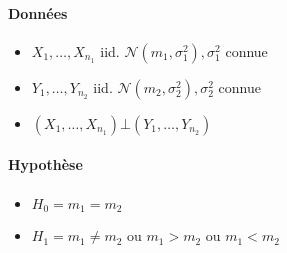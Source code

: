 \documentclass{article}
\theoremstyle{plain}%
\theoremstyle{definition}
\theoremstyle{remark}
\begin{document}
\paragraph*{Données}
\begin{itemize}
    \item $ X_1, \dots, X_{n_1}  $ iid. $ \mathcal{N}(m_1, \sigma_1 ^2), \sigma_1^2 $ connue
    \item $ Y_1, \dots, Y_{n_2}  $ iid. $ \mathcal{N}(m_2, \sigma_2 ^2), \sigma_2^2 $ connue
    \item $ (X_1, \dots, X_{n_1}) \bot (Y_1, \dots, Y_{n_2}) $ 
\end{itemize}

\paragraph*{Hypothèse}
\begin{itemize}
    \item $ H_0 = m_1 = m_2 $ 
    \item $ H_1 = m_1 \neq m_2 $ ou $ m_1 > m_2 $ ou $ m_1 < m_2 $ 
\end{itemize}
\end{document}
